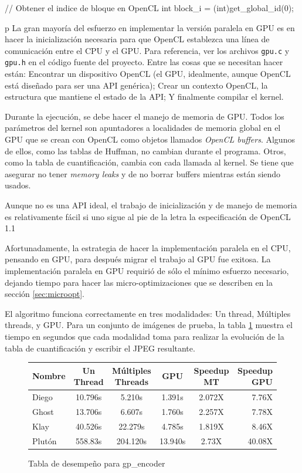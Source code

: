\begin{code}[language=C][h]
    // Obtener el indice de bloque en OpenCL
    int block_i = (int)get_global_id(0);
\end{code}
{p
La gran mayoría del esfuerzo en implementar la versión paralela en GPU es en
hacer la inicialización necesaria para que OpenCL establezca una línea de
comunicación entre el CPU y el GPU. Para referencia, ver los archivos
\verb+gpu.c+ y \verb+gpu.h+ en el código fuente del proyecto. Entre las cosas
que se necesitan hacer están: Encontrar un dispositivo OpenCL (el GPU,
idealmente, aunque OpenCL está diseñado para ser una API genérica); Crear un
contexto OpenCL, la estructura que mantiene el estado de la API; Y finalmente
compilar el kernel.

Durante la ejecución, se debe hacer el manejo de memoria de GPU. Todos los
parámetros del kernel son apuntadores a localidades de memoria global en el GPU
que se crean con OpenCL como objetos llamados \emph{OpenCL buffers}. Algunos de
ellos, como las tablas de Huffman, no cambian durante el programa. Otros, como
la tabla de cuantificación, cambia con cada llamada al kernel. Se tiene que
asegurar no tener \emph{memory leaks} y de no borrar buffers mientras están
siendo usados.

Aunque no es una API ideal, el trabajo de inicialización y de manejo de memoria
es relativamente fácil si uno sigue al pie de la letra la especificación de
OpenCL 1.1 \cite{opencl-spec}

Afortunadamente, la estrategia de hacer la implementación paralela en el CPU,
pensando en GPU, para después migrar el trabajo al GPU fue exitosa. La
implementación paralela en GPU requirió de sólo el mínimo esfuerzo necesario,
dejando tiempo para hacer las micro-optimizaciones que se describen en la
sección \ref{sec:microopt}.

El algoritmo funciona correctamente en tres modalidades: Un thread, Múltiples
threads, y GPU. Para un conjunto de imágenes de prueba, la tabla
\ref{fig:perf_table_orig} muestra el tiempo en segundos que cada modalidad toma
para realizar la evolución de la tabla de cuantificación y escribir el JPEG
resultante.

\begin{figure}[h]
    \begin{tabular}{ |l c c c c r| }
        \hline
        Nombre &  Un Thread & Múltiples Threads & GPU & Speedup MT & Speedup GPU \\
        \hline
        Diego & 10.796s & 5.210s & 1.391s  & 2.072X & 7.76X \\
        Ghost & 13.706s & 6.607s & 1.760s  & 2.257X & 7.78X \\
        Klay & 40.526s & 22.279s & 4.785s  & 1.819X & 8.46X \\%
        Plutón & 558.83s & 204.120s & 13.940s & 2.73X & 40.08X \\ %
        \hline
    \end{tabular}
    \caption{Tabla de desempeño para gp\_encoder}
    \label{fig:perf_table_orig}
\end{figure}

}
